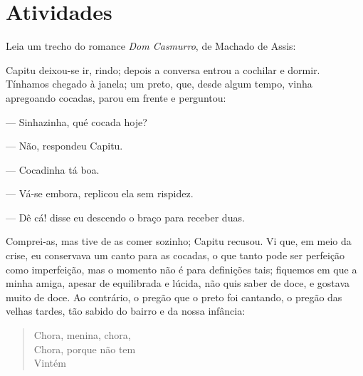 \section*{Atividades}





Leia um trecho do romance \textit{Dom Casmurro}, de Machado de Assis:

\begin{myquote}
Capitu deixou-se ir, rindo; depois a conversa entrou a cochilar e
dormir. Tínhamos chegado à janela; um preto, que, desde algum
tempo, vinha apregoando cocadas, parou em frente e perguntou:

--- Sinhazinha, qué cocada hoje?

--- Não, respondeu Capitu.

--- Cocadinha tá boa.

--- Vá-se embora, replicou ela sem rispidez.

--- Dê cá! disse eu descendo o braço para receber duas.

Comprei-as, mas tive de as comer sozinho; Capitu recusou. Vi
que, em meio da crise, eu conservava um canto para as cocadas, o
que tanto pode ser perfeição como imperfeição, mas o momento
não é para definições tais; fiquemos em que a minha amiga,
apesar de equilibrada e lúcida, não quis saber de doce, e gostava
muito de doce. Ao contrário, o pregão que o preto foi cantando, o
pregão das velhas tardes, tão sabido do bairro e da nossa infância:

\begin{verse}
Chora, menina, chora, \\
Chora, porque não tem \\
Vintém
\end{verse}


\end{myquote}

